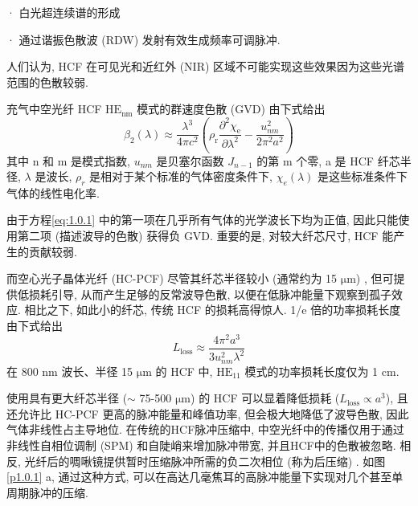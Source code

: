\documentclass[14pt,a4paper,oneside]{article}
\numberwithin{equation}{subsection}             %
\numberwithin{figure}{subsection}               %
\begin{document}
· 白光超连续谱的形成\cite{dudleySupercontinuumGenerationPhotonic2006} 

· 通过谐振色散波 (RDW) 发射有效生成频率可调脉冲\cite{imHighpowerSolitoninducedSupercontinuum2010, jolyBrightSpatiallyCoherent2011, waiNonlinearPulsePropagation1986, makTunableVacuumUVVisible2013, belliVacuumultravioletInfraredSupercontinuum2015, ermolovSupercontinuumGenerationVacuum2015, brombergerAngleresolvedPhotoemissionSpectroscopy2015, kottigGenerationMicrojoulePulses2017}. 

人们认为, HCF 在可见光和近红外 (NIR) 区域不可能实现这些效果因为这些光谱范围的色散较弱. 

充气中空光纤 HCF $\mathrm{HE_{nm}}$ 模式的群速度色散 (GVD) 由下式给出
\begin{equation}
    \beta_2(\lambda)\approx\frac{\lambda^3}{4\pi c^2}\left(\rho_\mathrm{r}\frac{\partial^2\chi_\mathrm{e}}{\partial\lambda^2}-\frac{u_{nm}^2}{2\pi^2a^2}\right)
    \label{eq:1.0.1}
\end{equation}
其中 n 和 m 是模式指数, $u_{nm}$ 是贝塞尔函数 $J_{n-1}$ 的第 m 个零, a 是 HCF 纤芯半径, $\lambda$ 是波长, $\rho_r$ 是相对于某个标准的气体密度条件下, $\chi_e(\lambda)$ 是这些标准条件下气体的线性电化率. 

由于方程\ref{eq:1.0.1} 中的第一项在几乎所有气体的光学波长下均为正值, 因此只能使用第二项 (描述波导的色散) 获得负 GVD. 重要的是, 对较大纤芯尺寸, HCF 能产生的贡献较弱. 

而空心光子晶体光纤 (HC-PCF) 尽管其纤芯半径较小 (通常约为 15 $\mathrm{\mu m}$) , 但可提供低损耗引导, 从而产生足够的反常波导色散, 以便在低脉冲能量下观察到孤子效应. 相比之下, 如此小的纤芯, 传统 HCF 的损耗高得惊人\cite{marcatiliHollowMetallicDielectric1964}.  1/e 倍的功率损耗长度由下式给出
\begin{equation}
    L_\mathrm{loss}\approx\frac{4\pi^2a^3}{3u_{nm}^2\lambda^2}
    \label{eq:1.0.2}
\end{equation}
在 800 nm 波长、半径 15 $\mathrm{\mu m}$ 的 HCF 中, $\mathrm{HE_{11}}$ 模式的功率损耗长度仅为 1 cm. 

使用具有更大纤芯半径 ($\sim$ 75-500 $\mathrm{\mu m}$) 的 HCF 可以显着降低损耗 ($L_{\mathrm{loss}} \propto  a^3$), 且还允许比 HC-PCF 更高的脉冲能量和峰值功率, 但会极大地降低了波导色散, 因此气体非线性占主导地位. 在传统的HCF脉冲压缩中, 中空光纤中的传播仅用于通过非线性自相位调制 (SPM) 和自陡峭来增加脉冲带宽, 并且HCF中的色散被忽略. 相反, 光纤后的啁啾镜提供暂时压缩脉冲所需的负二次相位 (称为后压缩) . 如图 \ref{p1.0.1} a, 通过这种方式, 可以在高达几毫焦耳的高脉冲能量下实现对几个甚至单周期脉冲的压缩. 
\end{document}
